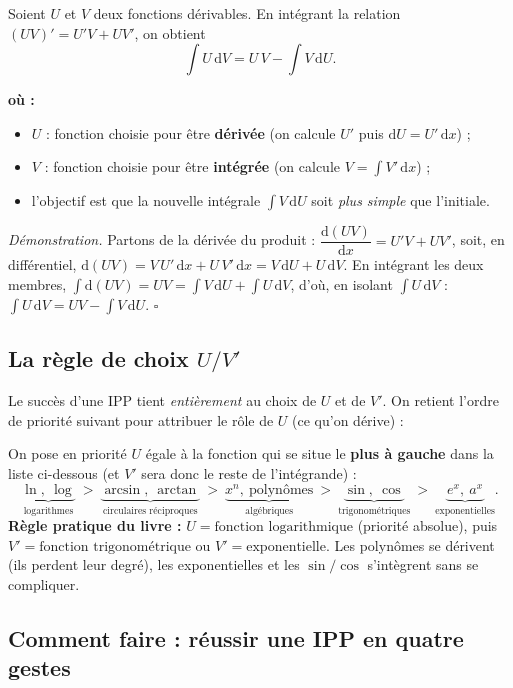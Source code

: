 \documentclass[11pt,a4paper]{article}
\newenvironment{ou}{%
  \par\smallskip\noindent\textbf{où :}\nopagebreak
  \begin{itemize}[leftmargin=1.8em,topsep=2pt,itemsep=1.5pt,parsep=0pt]}%
  {\end{itemize}}
\newcommand{\dd}{\mathrm{d}}
\begin{document}
\begin{theoreme}
Soient $U$ et $V$ deux fonctions dérivables. En intégrant la relation $(UV)'=U'V+UV'$, on obtient
\[
\boxed{\;\int U\,\dd V = U\,V-\int V\,\dd U.\;}
\]
\begin{ou}
  \item $U$ : fonction choisie pour être \textbf{dérivée} (on calcule $U'$ puis $\dd U=U'\,\dd x$) ;
  \item $V$ : fonction choisie pour être \textbf{intégrée} (on calcule $V=\int V'\,\dd x$) ;
  \item l'objectif est que la nouvelle intégrale $\int V\,\dd U$ soit \emph{plus simple} que l'initiale.
\end{ou}
\end{theoreme}

\textit{Démonstration.} Partons de la dérivée du produit :
$\dfrac{\dd(UV)}{\dd x}=U'V+UV'$, soit, en différentiel,
$\dd(UV)=V\,U'\,\dd x+U\,V'\,\dd x=V\,\dd U+U\,\dd V$.
En intégrant les deux membres,
$\int\dd(UV)=UV=\int V\,\dd U+\int U\,\dd V$, d'où, en isolant $\int U\,\dd V$ :
$\int U\,\dd V=UV-\int V\,\dd U$. \hfill$\square$

\subsection{La règle de choix $U/V'$}

Le succès d'une IPP tient \emph{entièrement} au choix de $U$ et de $V'$. On retient l'ordre de
priorité suivant pour attribuer le rôle de $U$ (ce qu'on dérive) :

\begin{methode}
On pose en priorité $U$ égale à la fonction qui se situe le \textbf{plus à gauche} dans la liste
ci-dessous (et $V'$ sera donc le reste de l'intégrande) :
\[
\underbrace{\ln,\ \log}_{\text{logarithmes}}
\ >\ 
\underbrace{\arcsin,\ \arctan}_{\text{circulaires réciproques}}
\ >\ 
\underbrace{x^n,\ \text{polynômes}}_{\text{algébriques}}
\ >\ 
\underbrace{\sin,\ \cos}_{\text{trigonométriques}}
\ >\ 
\underbrace{e^{x},\ a^{x}}_{\text{exponentielles}}.
\]
\textbf{Règle pratique du livre :} $U=\text{fonction logarithmique}$ (priorité absolue), puis
$V'=\text{fonction trigonométrique}$ ou $V'=\text{exponentielle}$. Les polynômes se dérivent
(ils perdent leur degré), les exponentielles et les $\sin/\cos$ s'intègrent sans se compliquer.
\end{methode}

\subsection{Comment faire : réussir une IPP en quatre gestes}
\end{document}
